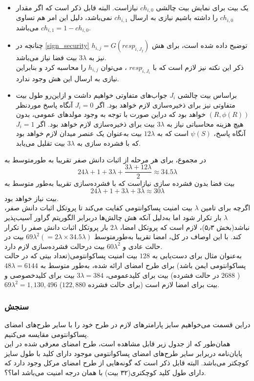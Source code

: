 \begin{itemize}
\begin{itemize}
{}
\item{
یک بیت برای نمایش بیت چالشی
$ch_{i,0}$
نیازاست. البته قابل ذکر است که اگر مقدار
$ch_{i,0}$
را داشته باشیم نیازی به ارسال
$ch_{i,1}$
نمی‌باشد، دلیل این امر هم تساوی 
$ch_{i,1} = 1 - ch_{i,0}$
می‌باشد.
}
\item{
چنانچه در
\ref{sign_security}
 توضیح داده شده است، برای هش
$h_{i,j} = G(resp_{i,J_I})$
نیز به
$3 \lambda$
بیت فضا نیاز می‌باشد.
\\
 ذکر این نکته نیز لازم است که با 
$resp_{i,J_i}$
، می‌توان
$h_{i,j}$
را محاسبه کرد و بنابراین نیازی به ارسال این هش وجود ندارد.
}
\item{
براساس بیت چالشی
$J_i$
جواب‌های متفاوتی خواهیم داشت و ازاین‌رو طول بیت متفاوتی نیز برای ذخیره‌سازی لازم خواهد بود. اگر
$J_i = 0$
آنگاه پاسخ موردنظر
$(R,\phi(R))$
خواهد بود که دراین صورت با توجه به وجود مولدهای عمومی، بدون هیچ هزینه محاسباتی نیاز به 
$3 \lambda$
بیت برای ذخیره‌سازی لازم خواهد بود.
اگر
$J_i = 1$
آنگاه پاسخ،
$\psi(S)$
است که به
$12 \lambda$
بیت به‌عنوان یک عنصر میدان لازم خواهد بود که با فشرده سازی به
$3 \lambda$
بیت تقلیل می‌یابد.
}
\end{itemize}
   
\end{itemize}	
در مجموع، برای هر مرحله از اثبات دانش صفر تقریبا به طورمتوسط به 
$$24 \lambda + 1  + 3 \lambda + \frac{3\lambda + 12\lambda}{2} \approx 34.5\lambda$$
بیت فضا بدون فشرده سازی نیازاست که با فشرده‌سازی تقریبا به‌طور متوسط به 
$$24 \lambda + 1 + 3 \lambda + 3 \lambda \approx 30\lambda$$
بیت نیاز خواهد بود.
\\

اگرچه برای تامین
$\lambda$
بیت امنیت پساکوانتومی کفایت می‌کند تا پروتکل اثبات دانش صفر،
$\lambda$
بار تکرار شود اما به‌دلیل آنکه هش چالش‌ها دربرابر الگوریتم گراور
\cite{grover}
آسیب‌پذیر نباشد(بخش ۵٫۳)، لازم است که پروتکل امضا،
$2\lambda$
بار پروتکل اثبات دانش صفر را تکرار کند. با این اوصاف در کل، امضا تقریبا به‌طورمتوسط
$69{\lambda}^2(=2\lambda \times 34.5\lambda)$
بیت در حالت عادی و 
$60{\lambda}^2$
بیت درحالت فشرده‌سازی لازم دارد.
\\
به‌عنوان مثال برای دست‌یابی به 
$128$
بیت امنیت پساکوانتومی(تعداد بیتی که در حالت پساکوانتومی ایمن باشد) برای طرح امضای ارائه شده، به‌طور متوسط به
$48\lambda = 6144$
(
$2688$
در حالت فشرده) بیت برای کلیدعمومی، 
$3\lambda = 384$
بیت برای کلیدخصوصی و
\\
$69{\lambda}^2 = 1,130,496$
($122,880$
برای حالت فشرده) بیت برای امضا لازم است.
\subsubsection{سنجش}
دراین قسمت می‌خواهیم سایز پارامترهای لازم در طرح خود را با سایر طرح‌های امضای پساکوانتومی مقایسه می‌کنیم.
\\
همان‌طور که از جدول زیر قابل مشاهده‌ است، طرح امضای معرفی شده در این پایان‌نامه دربرابر سایر طرح‌های امضای پساکوانتومی موجود دارای کلید با طول سایز کوچکتر می‌باشد. البته قابل ذکر است که گونه‌هایی از طرح امضای مرکل وجود دارد که دارای طول کلید کوچکتری(۳۲ بیت) با همان درجه امنیت می‌باشد اما؟؟.

